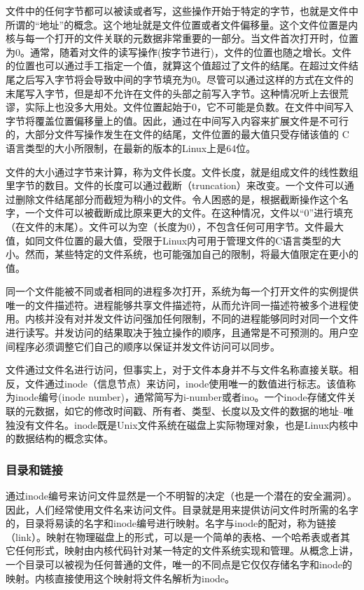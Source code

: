 文件中的任何字节都可以被读或者写，这些操作开始于特定的字节，也就是文件中所谓的“地址”的概念。这个地址就是文件位置或者文件偏移量。这个文件位置是内核与每一个打开的文件关联的元数据非常重要的一部分。当文件首次打开时，位置为0。通常，随着对文件的读写操作(按字节进行)，文件的位置也随之增长。文件的位置也可以通过手工指定一个值，就算这个值超过了文件的结尾。在超过文件结尾之后写入字节将会导致中间的字节填充为0。尽管可以通过这样的方式在文件的末尾写入字节，但是却不允许在文件的头部之前写入字节。这种情况听上去很荒谬，实际上也没多大用处。文件位置起始于0，它不可能是负数。在文件中间写入字节将覆盖位置偏移量上的值。因此，通过在中间写入内容来扩展文件是不可行的，大部分文件写操作发生在文件的结尾，文件位置的最大值只受存储该值的 C语言类型的大小所限制，在最新的版本的Linux上是64位。

文件的大小通过字节来计算，称为文件长度。文件长度，就是组成文件的线性数组里字节的数目。文件的长度可以通过截断（truncation）来改变。一个文件可以通过删除文件结尾部分而截短为稍小的文件。令人困惑的是，根据截断操作这个名字，一个文件可以被截断成比原来更大的文件。在这种情况，文件以“0”进行填充（在文件的末尾）。文件可以为空（长度为0），不包含任何可用字节。文件最大值，如同文件位置的最大值，受限于Linux内可用于管理文件的C语言类型的大小。然而，某些特定的文件系统，也可能强加自己的限制，将最大值限定在更小的值。

同一个文件能被不同或者相同的进程多次打开，系统为每一个打开文件的实例提供唯一的文件描述符。进程能够共享文件描述符，从而允许同一描述符被多个进程使用。内核并没有对并发文件访问强加任何限制，不同的进程能够同时对同一个文件进行读写。并发访问的结果取决于独立操作的顺序，且通常是不可预测的。用户空间程序必须调整它们自己的顺序以保证并发文件访问可以同步。

文件通过文件名进行访问，但事实上，对于文件本身并不与文件名称直接关联。相反，文件通过inode（信息节点）来访问，inode使用唯一的数值进行标志。该值称为inode编号(inode number)，通常简写为i-number或者ino。一个inode存储文件关联的元数据，如它的修改时间戳、所有者、类型、长度以及文件的数据的地址--唯独没有文件名。inode既是Unix文件系统在磁盘上实际物理对象，也是Linux内核中的数据结构的概念实体。

\subsubsection{目录和链接}

通过inode编号来访问文件显然是一个不明智的决定（也是一个潜在的安全漏洞）。因此，人们经常使用文件名来访问文件。目录就是用来提供访问文件时所需的名字的，目录将易读的名字和inode编号进行映射。名字与inode的配对，称为链接（link）。映射在物理磁盘上的形式，可以是一个简单的表格、一个哈希表或者其它任何形式，映射由内核代码针对某一特定的文件系统实现和管理。从概念上讲，一个目录可以被视为任何普通的文件，唯一的不同点是它仅仅存储名字和inode的映射。内核直接使用这个映射将文件名解析为inode。

